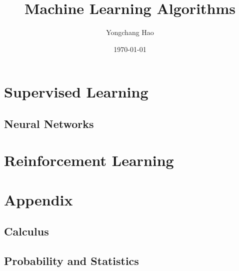 \documentclass{book}
\title{Machine Learning Algorithms}
\author{Yongchang Hao}
\date{\today}
\theoremstyle{plain}
\theoremstyle{definition}
\theoremstyle{remark}
\begin{document}
\setlength{\abovedisplayskip}{0em}
\setlength{\belowdisplayskip}{0em}
\setlength{\abovedisplayshortskip}{0em}
\setlength{\belowdisplayshortskip}{0em}

\maketitle
\tableofcontents

\part{Supervised Learning}

\chapter{Neural Networks}

\part{Reinforcement Learning}

\appendix

\part*{Appendix}\label{part:apdx}

\chapter{Calculus}
\chapter{Probability and Statistics}

\printbibliography
\end{document}

